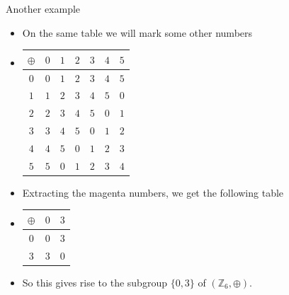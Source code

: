 \documentclass[ %
 10pt, xcolor={dvipsnames,svgnames,x11names,hyperref},
   hyperref={colorlinks=true,citecolor=green,linkcolor=DarkRed,urlcolor=ProcessBlue,anchorcolor=blue}
  ]{beamer}
\newenvironment{stepitemize}{\begin{itemize}[<+->]}{\end{itemize} }
\newcommand{\Z}{\mathbb{Z}}
\begin{document}
\begin{frame}{Another example}
\begin{stepitemize}
\item On the same table we will mark some other numbers
\item[]
\begin{table}[H]
\begin{tabular}{ c| c | c |c|c|c|c}
$\oplus$  & {\color{magenta} $0$} & $1$ & $2$ & {\color{magenta} $3$} &  $4$ & $5$\\
\hline
{\color{magenta} $0$}&{\color{magenta} $0$} & $1$ & $2$ & {\color{magenta} $3$} & $4$ & $5$\\
\hline
$1$&$1$ & $2$ & $3$ & $4$ & $5$ & $0$\\
\hline
 $2$ & $2$ & $3$ & $4$ & $5$ &  $0$ & $1$\\
\hline
{\color{magenta} $3$}& {\color{magenta} $3$} & $4$ & $5$ & {\color{magenta} $0$} & $1$ & $2$\\
\hline
$4$& $4$ & $5$ &  $0$ & $1$ &  $2$ & $3$\\
\hline
$5$&$5$ & $0$ & $1$ & $2$ & $3$ & $4$\\
\end{tabular}
\end{table}
\item Extracting the magenta numbers, we get the following table
\item[]
\begin{table}[H]
\begin{tabular}{ c| c | c}
$\oplus$  & {\color{magenta} $0$} & {\color{magenta} $3$} \\
\hline
{\color{magenta} $0$}&{\color{magenta} $0$} & {\color{magenta} $3$}\\
\hline
{\color{magenta} $3$} &{\color{magenta} $3$} & {\color{magenta} $0$}
\end{tabular}
\end{table}
\item So this gives rise to the subgroup $\{0,3\}$ of $(\Z_6, \oplus)$.
\end{stepitemize}

\end{frame}
\end{document}
